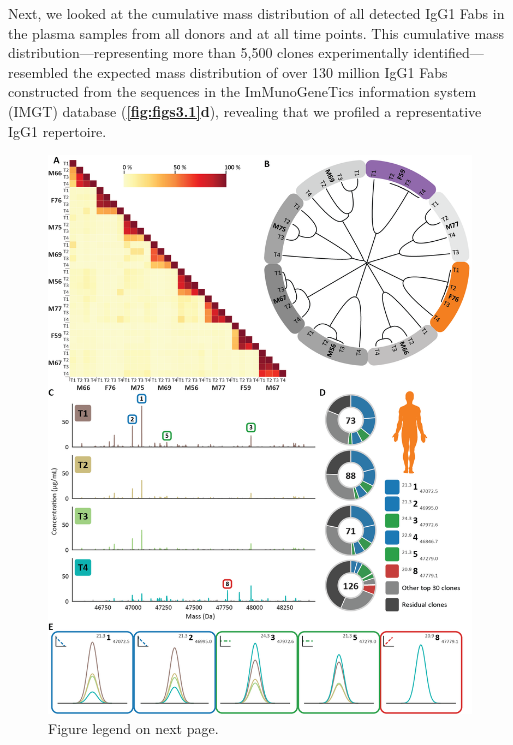 Next, we looked at the cumulative mass distribution of all detected IgG1 Fabs in the plasma samples from all donors and at all time points. This cumulative mass distribution—representing more than 5,500 clones experimentally identified—resembled the expected mass distribution of over 130 million IgG1 Fabs constructed from the sequences in the ImMunoGeneTics information system (IMGT) \cite{lefranc1999imgt} database (\textbf{\autoref{fig:figs3.1}d}), revealing that we profiled a representative IgG1 repertoire.

\begin{figure}[!hp]
  \center
  \includegraphics[]{Chapter.3/Figures/f2.png}
  \captionsetup{singlelinecheck = false, format= hang}
  \caption{
    Figure legend on next page.
  }
  \label{fig:fig3.2}
\end{figure}
\addtocounter{figure}{-1}
